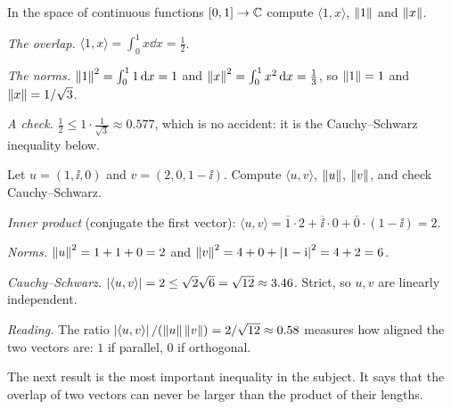 \begin{example}\label{ex:fn-inner}
  In the space of continuous functions $[0,1]\to\mathbb{C}$ compute $\langle 1,x\rangle$, $\left\|1\right\|$ and $\left\|x\right\|$.
\end{example}
\begin{solution}
  \begin{steps}
    \item \emph{The overlap.} $\langle1,x\rangle=\int_0^1x\dd x=\tfrac12$.
    \item \emph{The norms.} $\left\|1\right\|^2=\int_0^11\,\mathrm{d} x=1$ and $\left\|x\right\|^2=\int_0^1x^2\,\mathrm{d} x=\tfrac13$, so $\left\|1\right\|=1$ and $\left\|x\right\|=1/\sqrt3$.
    \item \emph{A check.} $\tfrac12\le1\cdot\tfrac1{\sqrt3}\approx0.577$, which is no accident: it is the Cauchy--Schwarz inequality below.
  \end{steps}
\end{solution}

\begin{example}\label{ex:c3-inner}
  Let $u=(1,\ii,0)$ and $v=(2,0,1-\ii)$. Compute $\langle u,v\rangle$, $\left\|u\right\|$, $\left\|v\right\|$, and check Cauchy--Schwarz.
\end{example}
\begin{solution}
  \begin{steps}
    \item \emph{Inner product} (conjugate the first vector): $\langle u,v\rangle=\bar1\cdot2+\overline{\ii}\cdot0+\bar0\cdot(1-\ii)=2$.
    \item \emph{Norms.} $\left\|u\right\|^2=1+1+0=2$ and $\left\|v\right\|^2=4+0+\left|1-\mathrm{i}\right|^2=4+2=6$.
    \item \emph{Cauchy--Schwarz.} $\left|\langle u,v\rangle\right|=2\le\sqrt2\sqrt6=\sqrt{12}\approx3.46$. Strict, so $u,v$ are linearly independent.
    \item \emph{Reading.} The ratio $\left|\langle u,v\rangle\right|/(\left\|u\right\|\left\|v\right\|)=2/\sqrt{12}\approx0.58$ measures how aligned the two vectors are: $1$ if parallel, $0$ if orthogonal.
  \end{steps}
\end{solution}

The next result is the most important inequality in the subject. It says that the overlap of two vectors can never be larger than the product of their lengths.

